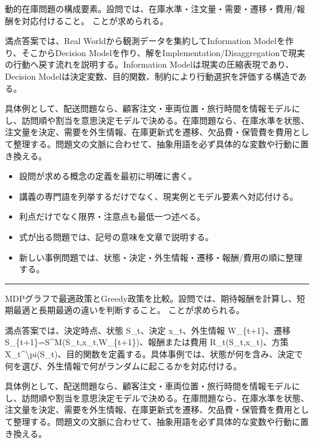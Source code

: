 動的在庫問題の構成要素。設問では、在庫水準・注文量・需要・遷移・費用/報酬を対応付けること。 ことが求められる。\par
{}
満点答案では、Real Worldから観測データを集約してInformation Modelを作り、そこからDecision Modelを作り、解をImplementation/Disaggregationで現実の行動へ戻す流れを説明する。Information Modelは現実の圧縮表現であり、Decision Modelは決定変数、目的関数、制約により行動選択を評価する構造である。\par
{}
具体例として、配送問題なら、顧客注文・車両位置・旅行時間を情報モデルにし、訪問順や割当を意思決定モデルで決める。在庫問題なら、在庫水準を状態、注文量を決定、需要を外生情報、在庫更新式を遷移、欠品費・保管費を費用として整理する。問題文の文脈に合わせて、抽象用語を必ず具体的な変数や行動に置き換える。\par
{}
\begin{itemize}
\item 設問が求める概念の定義を最初に明確に書く。
\item 講義の専門語を列挙するだけでなく、現実例とモデル要素へ対応付ける。
\item 利点だけでなく限界・注意点も最低一つ述べる。
\item 式が出る問題では、記号の意味を文章で説明する。
\item 新しい事例問題では、状態・決定・外生情報・遷移・報酬/費用の順に整理する。
\end{itemize}
\vspace{2mm}\hrule\vspace{2mm}
MDPグラフで最適政策とGreedy政策を比較。設問では、期待報酬を計算し、短期最適と長期最適の違いを判断すること。 ことが求められる。\par
{}
満点答案では、決定時点、状態 S\_t、決定 x\_t、外生情報 W\_\{t+1\}、遷移 S\_\{t+1\}=S\textasciicircum{}M(S\_t,x\_t,W\_\{t+1\})、報酬または費用 R\_t(S\_t,x\_t)、方策 X\_t\textasciicircum{}\textbackslash{}pi(S\_t)、目的関数を定義する。具体事例では、状態が何を含み、決定で何を選び、外生情報で何がランダムに起こるかを対応付ける。\par
{}
具体例として、配送問題なら、顧客注文・車両位置・旅行時間を情報モデルにし、訪問順や割当を意思決定モデルで決める。在庫問題なら、在庫水準を状態、注文量を決定、需要を外生情報、在庫更新式を遷移、欠品費・保管費を費用として整理する。問題文の文脈に合わせて、抽象用語を必ず具体的な変数や行動に置き換える。\par
